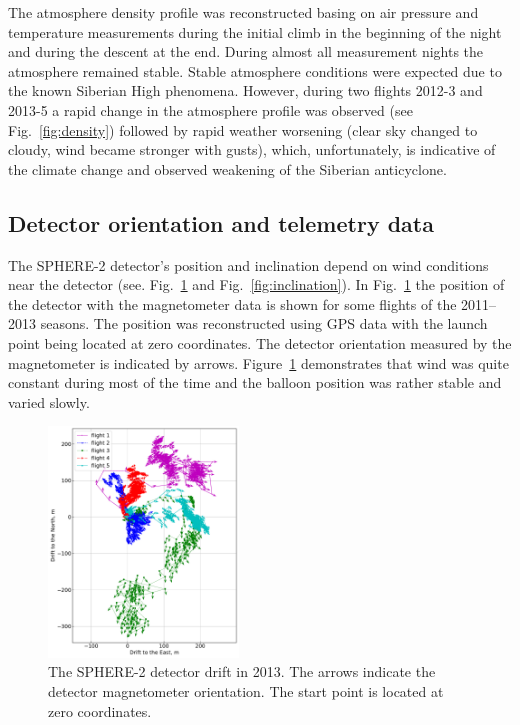 \documentclass[final,5p,times,twocolumn]{elsarticle}
\begin{document}
The atmosphere density profile was reconstructed basing on air pressure and temperature measurements during the initial climb in the beginning of the night and during the descent at the end. During almost all measurement nights the atmosphere remained stable. Stable atmosphere conditions were expected due to the known Siberian High phenomena. However, during two flights 2012-3 and 2013-5 a rapid change in the atmosphere profile was observed (see Fig.~\ref{fig:density}) followed by rapid weather worsening (clear sky changed to cloudy, wind became stronger with gusts), which, unfortunately, is indicative of the climate change and observed weakening of the Siberian anticyclone. 

\subsection{Detector orientation and telemetry data}
\label{sect:telemetrydata}

The \mbox{SPHERE-2} detector's position and inclination depend on wind conditions near the detector (see. Fig.~\ref{fig:gps_compass} and Fig.~\ref{fig:inclination}). In Fig.~\ref{fig:gps_compass} the position of the detector with the magnetometer data is shown for some flights of the 2011--2013 seasons. The position was reconstructed using GPS data with the launch point being located at zero coordinates. The detector orientation measured by the magnetometer is indicated by arrows. Figure~\ref{fig:gps_compass} demonstrates that wind was quite constant during most of the time and the balloon position was rather stable and varied slowly.  

\begin{figure}[tb]
    \includegraphics[width=0.45\textwidth]{GPS+quiver.pdf}\hspace{2pc}%
    \caption{The SPHERE-2 detector drift in 2013. The arrows indicate the detector magnetometer orientation. The start point is located at zero coordinates.}
\label{fig:gps_compass}
\end{figure}
\end{document}
